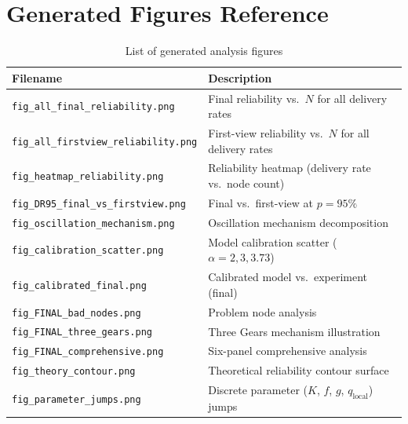 \documentclass[
12pt,
oneside,
singlespacing,
parskip,
]{article}
\begin{document}
\section{Generated Figures Reference}
\label{app:figures}

\begin{table}[H]
\centering
\caption{List of generated analysis figures}
\begin{tabular}{ll}
\toprule
\textbf{Filename} & \textbf{Description} \\
\midrule
\texttt{fig\_all\_final\_reliability.png} & Final reliability vs.\ $N$ for all delivery rates \\
\texttt{fig\_all\_firstview\_reliability.png} & First-view reliability vs.\ $N$ for all delivery rates \\
\texttt{fig\_heatmap\_reliability.png} & Reliability heatmap (delivery rate vs.\ node count) \\
\texttt{fig\_DR95\_final\_vs\_firstview.png} & Final vs.\ first-view at $p = 95\%$ \\
\texttt{fig\_oscillation\_mechanism.png} & Oscillation mechanism decomposition \\
\texttt{fig\_calibration\_scatter.png} & Model calibration scatter ($\alpha = 2, 3, 3.73$) \\
\texttt{fig\_calibrated\_final.png} & Calibrated model vs.\ experiment (final) \\
\texttt{fig\_FINAL\_bad\_nodes.png} & Problem node analysis \\
\texttt{fig\_FINAL\_three\_gears.png} & Three Gears mechanism illustration \\
\texttt{fig\_FINAL\_comprehensive.png} & Six-panel comprehensive analysis \\
\texttt{fig\_theory\_contour.png} & Theoretical reliability contour surface \\
\texttt{fig\_parameter\_jumps.png} & Discrete parameter ($K$, $f$, $g$, $q_\mathrm{local}$) jumps \\
\bottomrule
\end{tabular}
\end{table}
\end{document}
